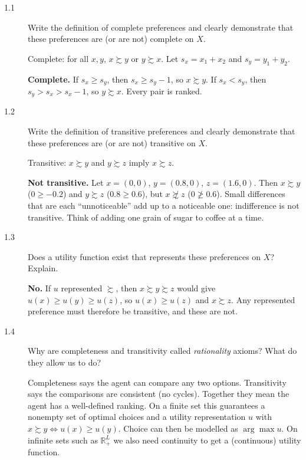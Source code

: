 \begin{description}
\item[1.1] Write the definition of complete preferences and clearly demonstrate that these preferences are (or are not) complete on $X$.
\begin{solution}
Complete: for all $x,y$, $x\succsim y$ or $y\succsim x$. Let $s_x=x_1+x_2$ and $s_y=y_1+y_2$.

\textbf{Complete.} If $s_x\ge s_y$, then $s_x\ge s_y-1$, so $x\succsim y$. If $s_x<s_y$, then $s_y>s_x>s_x-1$, so $y\succsim x$. Every pair is ranked.
\end{solution}
\item[1.2] Write the definition of transitive preferences and clearly demonstrate that these preferences are (or are not) transitive on $X$.
\begin{solution}
Transitive: $x\succsim y$ and $y\succsim z$ imply $x\succsim z$.

\textbf{Not transitive.} Let $x=(0,0)$, $y=(0.8,0)$, $z=(1.6,0)$. Then $x\succsim y$ ($0\ge-0.2$) and $y\succsim z$ ($0.8\ge0.6$), but $x\not\succsim z$ ($0\not\ge0.6$). Small differences that are each ``unnoticeable'' add up to a noticeable one: indifference is not transitive. Think of adding one grain of sugar to coffee at a time.
\end{solution}
\item[1.3] Does a utility function exist that represents these preferences on $X$? Explain.
\begin{solution}
\textbf{No.} If $u$ represented $\succsim$, then $x\succsim y\succsim z$ would give $u(x)\ge u(y)\ge u(z)$, so $u(x)\ge u(z)$ and $x\succsim z$. Any represented preference must therefore be transitive, and these are not.
\end{solution}
\item[1.4] Why are completeness and transitivity called \emph{rationality} axioms? What do they allow us to do?
\begin{solution}
Completeness says the agent can compare any two options. Transitivity says the comparisons are consistent (no cycles). Together they mean the agent has a well-defined ranking. On a finite set this guarantees a nonempty set of optimal choices and a utility representation $u$ with $x\succsim y\iff u(x)\ge u(y)$. Choice can then be modelled as $\arg\max u$. On infinite sets such as $\mathbb{R}^L_+$ we also need continuity to get a (continuous) utility function.
\end{solution}
\end{description}

